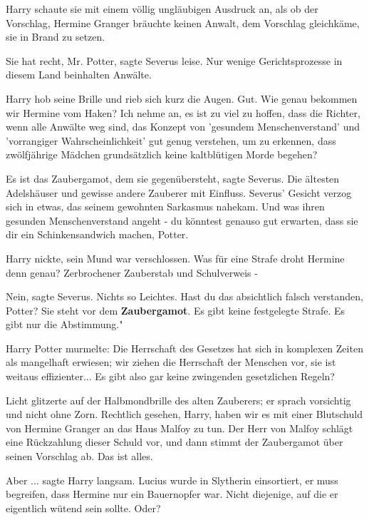 Harry schaute sie mit einem völlig ungläubigen Ausdruck an, als ob der
Vorschlag, Hermine Granger bräuchte keinen Anwalt, dem Vorschlag gleichkäme, sie
in Brand zu setzen.

\glqq Sie hat recht, Mr. Potter\grqq{}, sagte Severus leise. \glqq Nur wenige
Gerichtsprozesse in diesem Land beinhalten Anwälte.\grqq{}

Harry hob seine Brille und rieb sich kurz die Augen. \glqq Gut. Wie genau
bekommen wir Hermine vom Haken? Ich nehme an, es ist zu viel zu hoffen, dass die
Richter, wenn alle Anwälte weg sind, das Konzept von 'gesundem Menschenverstand'
und 'vorrangiger Wahrscheinlichkeit' gut genug verstehen, um zu erkennen, dass
zwölfjährige Mädchen grundsätzlich keine kaltblütigen Morde begehen?\grqq{}

\glqq Es ist das Zaubergamot, dem sie gegenübersteht\grqq{}, sagte Severus.
\glqq Die ältesten Adelshäuser und gewisse andere Zauberer mit Einfluss.\grqq{}
Severus' Gesicht verzog sich in etwas, das seinem gewohnten Sarkasmus nahekam.
\glqq Und was ihren gesunden Menschenverstand angeht - du könntest genauso gut
erwarten, dass sie dir ein Schinkensandwich machen, Potter.\grqq{}

Harry nickte, sein Mund war verschlossen. \glqq Was für eine Strafe droht
Hermine denn genau? Zerbrochener Zauberstab und Schulverweis -\grqq{}

\glqq Nein\grqq{}, sagte Severus. \glqq Nichts so Leichtes. Hast du das
absichtlich falsch verstanden, Potter? Sie steht vor dem \textbf{Zaubergamot}.
Es gibt keine festgelegte Strafe. Es gibt nur die Abstimmung."

Harry Potter murmelte: \glqq Die Herrschaft des Gesetzes hat sich in komplexen
Zeiten als mangelhaft erwiesen; wir ziehen die Herrschaft der Menschen vor, sie
ist weitaus effizienter... Es gibt also gar keine zwingenden gesetzlichen
Regeln?\grqq{}

Licht glitzerte auf der Halbmondbrille des alten Zauberers; er sprach vorsichtig
und nicht ohne Zorn. \glqq Rechtlich gesehen, Harry, haben wir es mit einer
Blutschuld von Hermine Granger an das Haus Malfoy zu tun. Der Herr von Malfoy
schlägt eine Rückzahlung dieser Schuld vor, und dann stimmt der Zaubergamot über
seinen Vorschlag ab. Das ist alles.\grqq{}

\glqq Aber ...\grqq{} sagte Harry langsam. \glqq Lucius wurde in Slytherin
einsortiert, er muss begreifen, dass Hermine nur ein Bauernopfer war. Nicht
diejenige, auf die er eigentlich wütend sein sollte. Oder?\grqq{}


